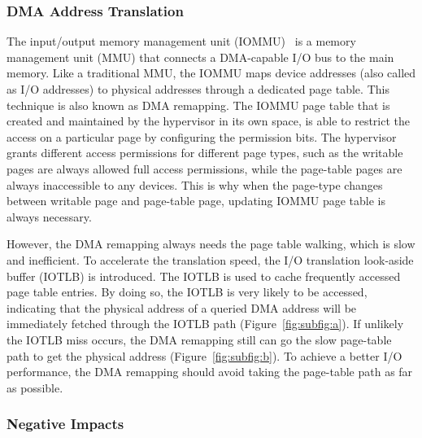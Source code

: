 \subsubsection{DMA Address Translation}
The input/output memory management unit (IOMMU)~\cite{directio} is a memory management unit (MMU) that connects a DMA-capable I/O bus to the main memory.
Like a traditional MMU, the IOMMU maps device addresses (also called as I/O addresses) to physical addresses through a dedicated page table.
This technique is also known as DMA remapping.
The IOMMU page table that is created and maintained by the hypervisor in its own space, is able to restrict the access on a particular page by configuring the permission bits.
The hypervisor grants different access permissions for different page types, such as the writable pages are always allowed full access permissions, while the page-table pages are always inaccessible to any devices.
This is why when the page-type changes between writable page and page-table page, updating IOMMU page table is always necessary.

However, the DMA remapping always needs the page table walking, which is slow and inefficient.
To accelerate the translation speed, the I/O translation look-aside buffer (IOTLB) is introduced.
The IOTLB is used to cache frequently accessed page table entries.
By doing so, the IOTLB is very likely to be accessed, indicating that the physical address of a queried DMA address will be immediately fetched through the IOTLB path (Figure~\ref{fig:subfig:a}).
If unlikely the IOTLB miss occurs, the DMA remapping still can go the slow page-table path to get the physical address (Figure~\ref{fig:subfig:b}).
To achieve a better I/O performance, the DMA remapping should avoid taking the page-table path as far as possible.

\subsubsection{Negative Impacts}

